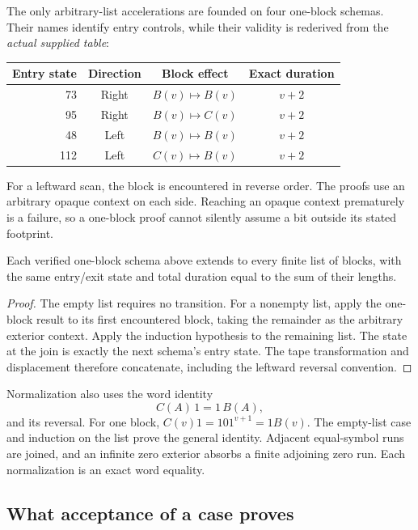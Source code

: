 The only arbitrary-list accelerations are founded on four one-block
schemas. Their names identify entry controls, while their validity
is rederived from the \emph{actual supplied table}:
\begin{center}
\begin{tabular}{@{}rccc@{}}
\toprule
Entry state & Direction & Block effect & Exact duration\\
\midrule
73 & Right & $B(v)\mapsto B(v)$ & $v+2$\\
95 & Right & $B(v)\mapsto C(v)$ & $v+2$\\
48 & Left & $B(v)\mapsto B(v)$ & $v+2$\\
112 & Left & $C(v)\mapsto B(v)$ & $v+2$\\
\bottomrule
\end{tabular}
\end{center}
For a leftward scan, the block is encountered in reverse order.
The proofs use an arbitrary opaque context on each side. Reaching an
opaque context prematurely is a failure, so a one-block proof
cannot silently assume a bit outside its stated footprint.

\begin{lemma}
\label{lem:list}
Each verified one-block schema above extends to every finite list
of blocks, with the same entry/exit state and total duration equal
to the sum of their lengths.
\end{lemma}
\begin{proof}
The empty list requires no transition. For a nonempty list, apply
the one-block result to its first encountered block, taking the
remainder as the arbitrary exterior context. Apply the induction
hypothesis to the remaining list. The state at the join is exactly
the next schema's entry state. The tape transformation and displacement
therefore concatenate, including the leftward reversal convention.
\end{proof}

Normalization also uses the word identity
\[
 C(A)\,1=1\,B(A),
\]
and its reversal. For one block,
$C(v)1=101^{v+1}=1B(v)$. The empty-list case and induction on the
list prove the general identity. Adjacent equal-symbol runs are
joined, and an infinite zero exterior absorbs a finite adjoining
zero run. Each normalization is an exact word equality.

\subsection{What acceptance of a case proves}

